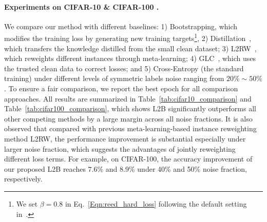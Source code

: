 \documentclass{article}
\begin{document}
\paragraph{Experiments on CIFAR-10 \& CIFAR-100 .} We compare our method with different baselines: 1) Bootstrapping, which modifies the training loss by generating new training targets\footnote{We set $\beta=0.8$ in Eq.~\eqref{Eqn:reed_hard_loss} following the default setting in~\cite{reed2014training}.}, 2) Distillation~\cite{li2017learning}, which transfers the knowledge distilled from the small clean dataset; 3) L2RW~\cite{ren2018learning}, which reweights different instances through meta-learning; 4) GLC~\cite{hendrycks2018using}, which uses the trusted clean data  to correct losses; and 5) Cross-Entropy (the standard training) under different levels of symmetric labels noise ranging from $20\%\sim 50\%$.
To ensure a fair comparison, we report the best epoch for all comparison approaches.
All results are summarized in Table~\ref{tab:cifar10_comparison} and Table~\ref{tab:cifar100_comparison}, which shows L2B significantly outperforms all other competing methods by a large margin across all noise fractions.
It is also observed that compared with previous meta-learning-based instance reweighting method L2RW, the performance improvement is substantial especially under larger noise fraction, which suggests the advantages of jointly reweighting different loss terms.
For example, on CIFAR-100, the accuracy improvement of our proposed L2B reaches $7.6\%$ and $8.9\%$ under 40\% and 50\% noise fraction, respectively. 
\end{document}
